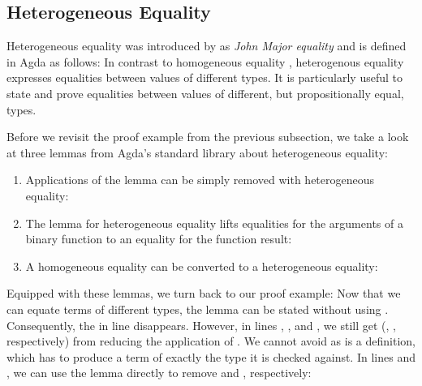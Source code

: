 \documentclass[acmsmall,anonymous,review,screen]{acmart}
\begin{document}


\subsection{Heterogeneous Equality}
\label{sec:subst-hell:het}

Heterogeneous equality was introduced by
\citet{DBLP:conf/types/McBride00} as \emph{John Major equality} and
is defined in Agda as follows:
\SubstExamplesHetEqDef
In contrast to homogeneous equality , heterogenous
equality expresses equalities between values of different
types. It is particularly useful to state and prove equalities between
values of different, but propositionally equal, types.

Before we revisit the proof example from the previous subsection, we take a look
at three lemmas from Agda's standard library about heterogeneous equality:

\begin{enumerate}
\item 
  Applications of the {\Asubst} lemma can be simply removed with heterogeneous equality:
  \SubstExamplesHetEqSubstRemovable
\item 
  The {} lemma for heterogeneous equality lifts
  equalities for the arguments of a binary function to an equality 
  for the function result:
  \SubstExamplesHetEqCongII
\item 
  A homogeneous equality can be converted to a heterogeneous equality:
  \SubstExamplesHetEqConv
\end{enumerate}

Equipped with these lemmas, we turn back to our proof example:
\SubstExamplesFusionESubESubHet
Now that we can equate terms of different types, the lemma can be
stated without using {\Asubst}.
Consequently, the {} in line  disappears.
However, in lines , , and , we still get
{} ({}, {}, respectively) from reducing the application of {\AESub}.
We cannot avoid {} as {\AESub} is a definition, which has to
produce a term of exactly the type it is checked against.
In lines  and , we can use the {} lemma
directly to remove {} and {}, respectively:
\SubstExamplesFusionESubESubHetProofB
\end{document}
